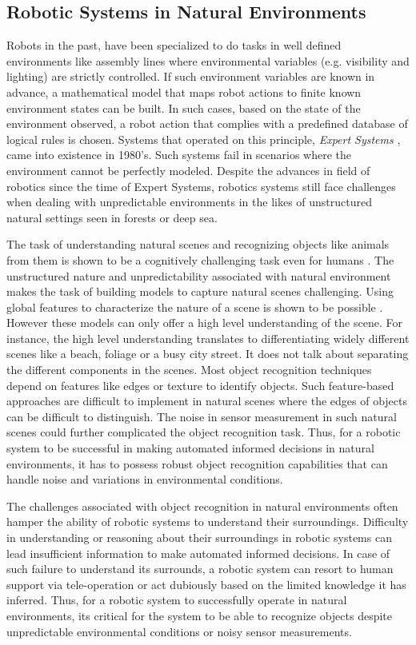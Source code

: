 \subsection{Robotic Systems in Natural Environments}
\label{sec:robots_nat_environ}

Robots in the past, have been specialized to do tasks in well defined environments like assembly lines where environmental variables (e.g. visibility and lighting) are strictly controlled. If such environment variables are known in advance, a mathematical model that maps robot actions to finite known environment states can be built. In such cases, based on the state of the environment observed, a robot action that complies with a predefined database of logical rules is chosen. Systems that operated on this principle, \emph{Expert Systems} 
\cite{russel}, came into existence in 1980's. Such systems fail in scenarios where the environment cannot be perfectly modeled. Despite the advances in field of robotics since the time of Expert Systems, robotics systems still face challenges when dealing with unpredictable environments in the likes of unstructured natural settings seen in forests or deep sea.

The task of understanding natural scenes and recognizing objects like animals from them is shown to be a cognitively challenging task 
even for humans \cite{wichmann}. The unstructured nature and unpredictability associated with natural environment makes the task of 
building models to capture natural scenes challenging.
Using global features to characterize the nature of a scene is shown to be possible \cite{olivia}. However these models can only offer a high level understanding
of the scene. For instance, the high level understanding translates to differentiating widely different scenes like a beach, foliage or a busy city street. It does not talk about separating the different components in the scenes. Most object recognition techniques depend on features like edges or texture to identify objects. Such feature-based approaches are difficult to implement in natural scenes where the edges of objects can be difficult to distinguish.
The noise in sensor measurement in such natural scenes could further complicated the object recognition task. 
Thus, for a robotic system to be
successful in making automated informed decisions in natural environments, it has to possess robust object recognition capabilities that can handle noise and variations in environmental conditions.

The challenges associated with object recognition in natural environments often hamper the ability of robotic systems to understand their surroundings.
Difficulty in understanding or reasoning about their surroundings in robotic systems can lead 
insufficient information to make automated 
informed decisions. In case of such failure to understand its surrounds, a robotic system can resort to human support via tele-operation or 
act dubiously based on the limited knowledge it has inferred. Thus, for a robotic system to successfully operate in natural environments, its critical for the system to be able to recognize objects despite unpredictable environmental conditions or noisy sensor measurements.


